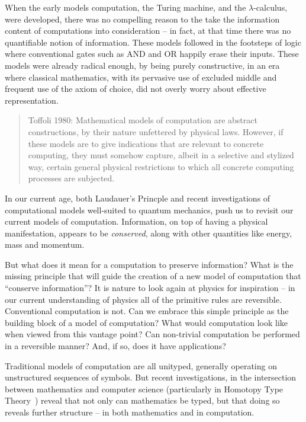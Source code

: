 \documentclass{article}
\begin{document}
When the early models computation, the Turing machine, and the
$\lambda$-calculus, were developed, there was no compelling reason to the
take the information content of computations into
consideration -- in fact, at that time there was no quantifiable
notion of information. These models followed in the footsteps of logic
where conventional gates such as AND and OR happily erase their
inputs. These models were already radical enough, by being purely
constructive, in an era where classical mathematics, with its
pervasive use of excluded middle and frequent use of the axiom of
choice, did not overly worry about effective representation.

\begin{quote}
Toffoli 1980: Mathematical models of computation are abstract
constructions, by their nature unfettered by physical laws. However,
if these models are to give indications that are relevant to concrete
computing, they must somehow capture, albeit in a selective and
stylized way, certain general physical restrictions to which all
concrete computing processes are subjected.
\end{quote}

In our current age, both Laudauer's Princple and recent investigations
of computational models well-suited to quantum mechanics, push us to
revisit our current models of computation. Information, on top of
having a physical manifestation, appears to be \emph{conserved},
along with other quantities like energy, mass and momentum.

But what does it mean for a computation to preserve information?
What is the missing principle that will guide the creation of a new
model of computation that ``conserve information''?
It is nature to look again at physics for inspiration --
in our current understanding of physics all of the primitive rules
are reversible. Conventional computation is not. Can
we embrace this simple principle as the building block of a model of
computation? What would computation look like when viewed from this
vantage point? Can non-trivial computation be performed in a
reversible manner? And, if so, does it have applications?

Traditional models of computation are all unityped, generally
operating on unstructured sequences of symbols. But recent
investigations, in the intersection between mathematics and
computer science (particularly in Homotopy Type Theory~\cite{HoTT-book})
reveal that not only can mathematics be typed, but that doing so
reveals further structure -- in both mathematics and in computation.
\end{document}
